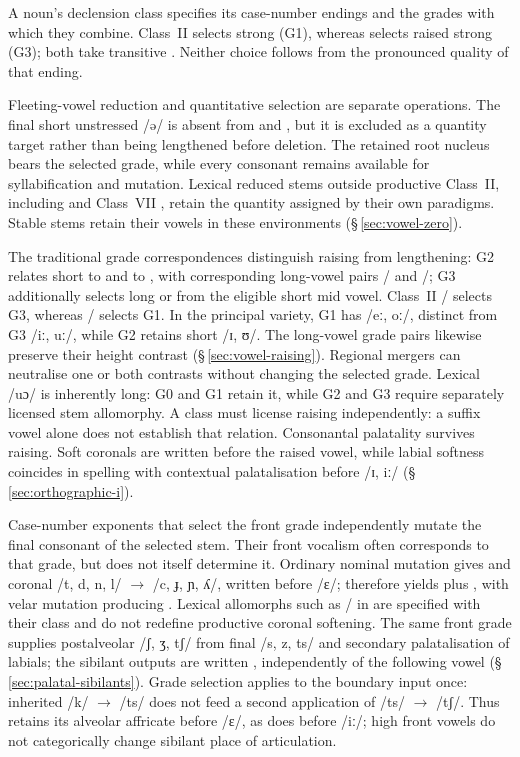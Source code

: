 A noun's declension class specifies its case-number endings and the grades
with which they combine. Class~II  selects strong
 (G1), whereas  selects raised strong
 (G3); both take transitive . Neither choice follows
from the pronounced quality of that ending.

Fleeting-vowel reduction and quantitative selection are separate operations.
The final short unstressed  /ə/ is absent from  and
, but it is excluded as a quantity target rather than being
lengthened before deletion. The retained root nucleus bears the selected
grade, while every consonant remains available for syllabification and
mutation. Lexical reduced stems outside productive Class~II, including
 and Class~VII , retain the quantity assigned by
their own paradigms. Stable stems retain their vowels in these environments
(§\,\ref{sec:vowel-zero}).

The traditional grade correspondences distinguish raising from lengthening:
G2 relates short
 to  and  to , with corresponding
long-vowel pairs / and /; G3 additionally
selects long  or  from the eligible short mid vowel.
Class~II / selects G3, whereas
/ selects G1. In the principal variety,
G1  has /eː, oː/, distinct from G3 
/iː, uː/, while G2 retains short /ɪ, ʊ/. The long-vowel grade pairs
likewise preserve their height contrast (§\,\ref{sec:vowel-raising}).
Regional mergers can neutralise one or both contrasts without changing
the selected grade. Lexical  /uɔ/ is inherently long: G0 and
G1 retain it, while G2 and G3 require separately licensed stem allomorphy.
A class must license
raising independently: a suffix vowel alone does not establish that relation.
Consonantal palatality survives raising. Soft coronals are written
 before the raised vowel, while labial softness
coincides in spelling with contextual palatalisation before /ɪ, iː/
(§\,\ref{sec:orthographic-i}).

Case-number exponents that select the front grade independently
mutate the final consonant of the selected stem. Their front vocalism often
corresponds to that grade, but does not itself determine it. Ordinary nominal
mutation gives  and coronal
/t, d, n, l/ $\rightarrow$ /c, ɟ, ɲ, ʎ/, written
 before /ɛ/;  therefore yields
 plus , with velar mutation producing .
Lexical allomorphs such as / in  are specified
with their class and do not redefine productive coronal softening. The same
front grade supplies postalveolar /ʃ, ʒ, tʃ/ from final /s, z, ts/ and
secondary palatalisation of labials; the sibilant outputs are written
, independently of the following vowel
(§\,\ref{sec:palatal-sibilants}). Grade selection applies to the boundary
input once: inherited /k/ $\rightarrow$ /ts/ does not feed a second application
of /ts/ $\rightarrow$ /tʃ/. Thus  retains its alveolar affricate
before /ɛ/, as does  before /iː/; high front vowels do not
categorically change sibilant place of articulation.


